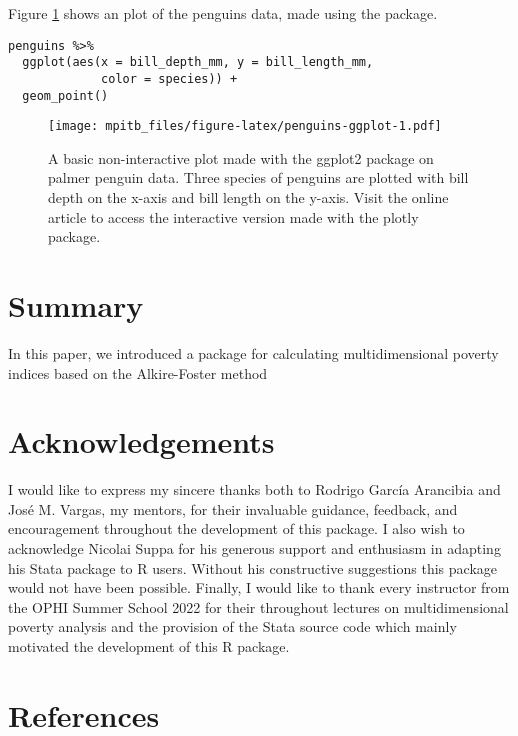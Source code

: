 Figure \ref{fig:penguins-ggplot} shows an plot of the penguins data, made using the  package.

\begin{verbatim}
penguins %>% 
  ggplot(aes(x = bill_depth_mm, y = bill_length_mm, 
             color = species)) + 
  geom_point()
\end{verbatim}

\begin{figure}
\centering
\texttt{[image: mpitb\_files/figure-latex/penguins-ggplot-1.pdf]}
\caption{\label{fig:penguins-ggplot}A basic non-interactive plot made with the ggplot2 package on palmer penguin data. Three species of penguins are plotted with bill depth on the x-axis and bill length on the y-axis. Visit the online article to access the interactive version made with the plotly package.}
\end{figure}

\hypertarget{summary}{%
\section{Summary}\label{summary}}

In this paper, we introduced a package for calculating multidimensional poverty indices based on the Alkire-Foster method

\hypertarget{acknowledgements}{%
\section{Acknowledgements}\label{acknowledgements}}

I would like to express my sincere thanks both to Rodrigo García Arancibia and José M. Vargas, my mentors, for their invaluable guidance, feedback, and encouragement throughout the development of this package. I also wish to acknowledge Nicolai Suppa for his generous support and enthusiasm in adapting his Stata package to R users. Without his constructive suggestions this package would not have been possible. Finally, I would like to thank every instructor from the OPHI Summer School 2022 for their throughout lectures on multidimensional poverty analysis and the provision of the Stata source code which mainly motivated the development of this R package.

\hypertarget{references}{%
\section*{References}\label{references}}

